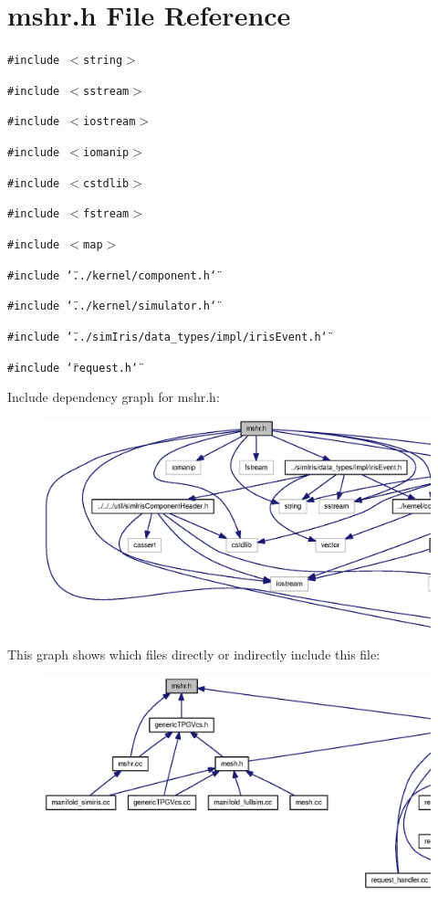 \section{mshr.h File Reference}
\label{mshr_8h}
{\tt \#include $<$string$>$}\par
{\tt \#include $<$sstream$>$}\par
{\tt \#include $<$iostream$>$}\par
{\tt \#include $<$iomanip$>$}\par
{\tt \#include $<$cstdlib$>$}\par
{\tt \#include $<$fstream$>$}\par
{\tt \#include $<$map$>$}\par
{\tt \#include \char`\"{}../kernel/component.h\char`\"{}}\par
{\tt \#include \char`\"{}../kernel/simulator.h\char`\"{}}\par
{\tt \#include \char`\"{}../simIris/data\_\-types/impl/irisEvent.h\char`\"{}}\par
{\tt \#include \char`\"{}request.h\char`\"{}}\par


Include dependency graph for mshr.h:\nopagebreak
\begin{figure}[H]
\begin{center}
\leavevmode
\includegraphics[width=420pt]{mshr_8h__incl}
\end{center}
\end{figure}


This graph shows which files directly or indirectly include this file:\nopagebreak
\begin{figure}[H]
\begin{center}
\leavevmode
\includegraphics[width=420pt]{mshr_8h__dep__incl}
\end{center}
\end{figure}

